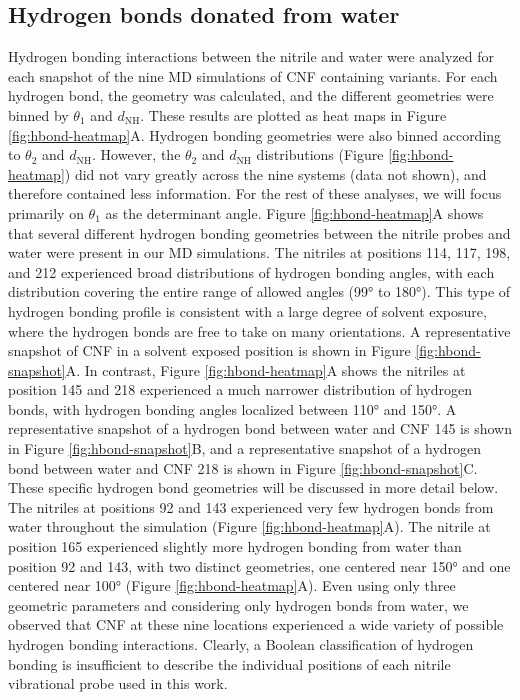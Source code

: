 \subsection{Hydrogen bonds donated from water}

Hydrogen bonding interactions between the nitrile and water were analyzed for each snapshot of the nine MD simulations of CNF containing variants.
For each hydrogen bond, the geometry was calculated, and the different geometries were binned by $\theta_1$ and $d_{\text{NH}}$.
These results are plotted as heat maps in Figure \ref{fig:hbond-heatmap}A.
Hydrogen bonding geometries were also binned according to $\theta_2$ and $d_{\text{NH}}$.
However, the $\theta_2$ and $d_{\text{NH}}$ distributions (Figure \ref{fig:hbond-heatmap}) did not vary greatly across the nine systems (data not shown), and therefore contained less information.
For the rest of these analyses, we will focus primarily on $\theta_1$ as the determinant angle.
Figure \ref{fig:hbond-heatmap}A shows that several different hydrogen bonding geometries between the nitrile probes and water were present in our MD simulations.
The nitriles at positions 114, 117, 198, and 212 experienced broad distributions of hydrogen bonding angles, with each distribution covering the entire range of allowed angles (\ang{99} to \ang{180}).
This type of hydrogen bonding profile is consistent with a large degree of solvent exposure, where the hydrogen bonds are free to take on many orientations.
A representative snapshot of CNF in a solvent exposed position is shown in Figure \ref{fig:hbond-snapshot}A.
In contrast, Figure \ref{fig:hbond-heatmap}A shows the nitriles at position 145 and 218 experienced a much narrower distribution of hydrogen bonds, with hydrogen bonding angles localized between \ang{110} and \ang{150}.
A representative snapshot of a hydrogen bond between water and CNF 145 is shown in Figure \ref{fig:hbond-snapshot}B, and a representative snapshot of a hydrogen bond between water and CNF 218 is shown in Figure \ref{fig:hbond-snapshot}C.
These specific hydrogen bond geometries will be discussed in more detail below.
The nitriles at positions 92 and 143 experienced very few hydrogen bonds from water throughout the simulation (Figure \ref{fig:hbond-heatmap}A).
The nitrile at position 165 experienced slightly more hydrogen bonding from water than position 92 and 143, with two distinct geometries, one centered near \ang{150} and one centered near \ang{100} (Figure \ref{fig:hbond-heatmap}A).
Even using only three geometric parameters and considering only hydrogen bonds from water, we observed that CNF at these nine locations experienced a wide variety of possible hydrogen bonding interactions.
Clearly, a Boolean classification of hydrogen bonding is insufficient to describe the individual positions of each nitrile vibrational probe used in this work. 

